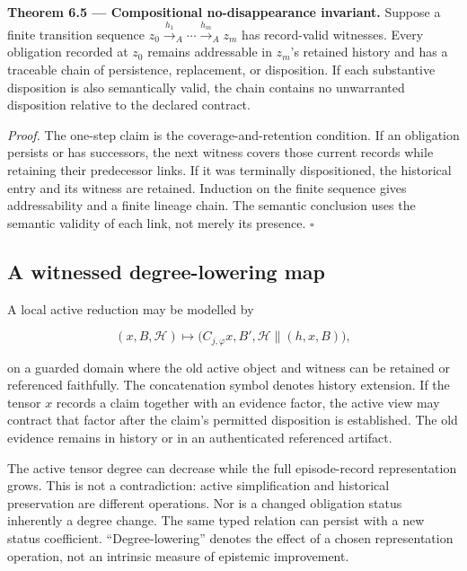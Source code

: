 \documentclass[11pt,a4paper]{article}
\begin{document}

\textbf{Theorem 6.5 --- Compositional no-disappearance invariant.}
Suppose a finite transition sequence
\(z_0\xrightarrow{h_1}_A\cdots\xrightarrow{h_m}_Az_m\) has record-valid
witnesses. Every obligation recorded at \(z_0\) remains addressable in
\(z_m\)'s retained history and has a traceable chain of persistence,
replacement, or disposition. If each substantive disposition is also
semantically valid, the chain contains no unwarranted disposition
relative to the declared contract.

\emph{Proof.} The one-step claim is the coverage-and-retention
condition. If an obligation persists or has successors, the next witness
covers those current records while retaining their predecessor links. If
it was terminally dispositioned, the historical entry and its witness
are retained. Induction on the finite sequence gives addressability and
a finite lineage chain. The semantic conclusion uses the semantic
validity of each link, not merely its presence. \(\square\)

\subsection{A witnessed degree-lowering
map}\label{a-witnessed-degree-lowering-map}

A local active reduction may be modelled by

\nopagebreak[4]

\[
(x,B,\mathscr H)\longmapsto
\bigl(C_{j,\varphi}x,B',\mathscr H\mathbin{\|}(h,x,B)\bigr),
\]

on a guarded domain where the old active object and witness can be
retained or referenced faithfully. The concatenation symbol denotes
history extension. If the tensor \(x\) records a claim together with an
evidence factor, the active view may contract that factor after the
claim's permitted disposition is established. The old evidence remains
in history or in an authenticated referenced artifact.

The active tensor degree can decrease while the full episode-record
representation grows. This is not a contradiction: active simplification
and historical preservation are different operations. Nor is a changed
obligation status inherently a degree change. The same typed relation
can persist with a new status coefficient. ``Degree-lowering'' denotes
the effect of a chosen representation operation, not an intrinsic
measure of epistemic improvement.
\end{document}
